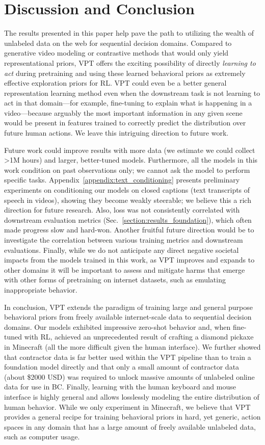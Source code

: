 \section{Discussion and Conclusion}
\label{section:discussion}
The results presented in this paper help pave the path to utilizing the wealth of unlabeled data on the web for sequential decision domains. 
Compared to generative video modeling or contrastive methods that would only yield representational priors, 
VPT offers the exciting possibility of directly \emph{learning to act} during pretraining and using these learned behavioral priors as extremely effective exploration priors for RL.
VPT could even be a better general representation learning method even when the downstream task is not learning to act in that domain—for example, fine-tuning to explain what is happening in a video—because arguably the most important information in any given scene would be present in features trained to correctly predict the distribution over future human actions. We leave this intriguing direction to future work.

Future work could improve results with more data (we estimate we could collect >1M hours) and larger, better-tuned models. Furthermore, all the models in this work condition on past observations only; we cannot ask the model to perform specific tasks. Appendix~\ref{appendix:text_conditioning} presents preliminary experiments on conditioning our models on closed captions (text transcripts of speech in videos), showing they become weakly steerable; we believe this a rich direction for future research.
Also, loss was not consistently correlated with downstream evaluation metrics (Sec.~\ref{section:results_foundation}), which often made progress slow and hard-won.
Another fruitful future direction would be to investigate the correlation between various training metrics and downstream evaluations.
Finally, while we do not anticipate any direct negative societal impacts from the models trained in this work, as VPT improves and expands to other domains it will be important to assess and mitigate harms that emerge with other forms of pretraining on internet datasets, such as emulating inappropriate behavior.\cite{bender2021dangers} 

In conclusion, VPT extends the paradigm of training large and general purpose behavioral priors from freely available internet-scale data to sequential decision domains.
Our models exhibited impressive zero-shot behavior and, when fine-tuned with RL, achieved an unprecedented result of crafting a diamond pickaxe in Minecraft (all the more difficult given the human interface).
We further showed that contractor data is far better used within the VPT pipeline than to train a foundation model directly and that only a small amount of contractor data (about \$2000 USD) was required to unlock massive amounts of unlabeled online data for use in BC. 
Finally, learning with the human keyboard and mouse interface is highly general and allows losslessly modeling the entire distribution of human behavior.
While we only experiment in Minecraft, we believe that VPT provides a general recipe for training behavioral priors in hard, yet generic, action spaces in any domain that has a large amount of freely available unlabeled data, such as computer usage.
